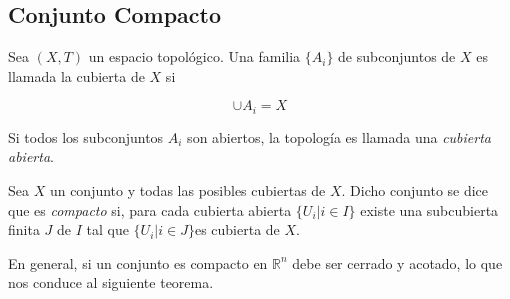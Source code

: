\documentclass{report}
\begin{document}





\subsection{Conjunto Compacto}

Sea $(X,T)$ un espacio topológico. Una familia $\lbrace A_{i} \rbrace$ de subconjuntos de $X$ es llamada la cubierta de $X$ si

\begin{equation}
\cup A_{i} = X
\end{equation}

Si todos los subconjuntos $A_{i}$ son abiertos, la topología es llamada una \textit{cubierta abierta}.

Sea $X$ un conjunto y todas las posibles cubiertas de $X$. Dicho conjunto se dice que es \textit{compacto} si, para cada cubierta abierta $\lbrace U_{i} | i \in I \rbrace$ existe una subcubierta finita $J$ de $I$ tal que $\lbrace U_{i} | i \in J \rbrace$es cubierta de $X$.

En general, si un conjunto es compacto en $\mathbb{R}^{n}$ debe ser cerrado y acotado, lo que nos conduce al siguiente teorema.
\end{document}

